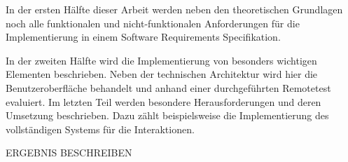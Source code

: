 	In der ersten Hälfte dieser Arbeit werden neben den theoretischen Grundlagen noch alle funktionalen und nicht-funktionalen Anforderungen für die Implementierung in einem Software Requirements Specifikation.
	
	In der zweiten Hälfte wird die Implementierung von besonders wichtigen Elementen beschrieben. Neben der technischen Architektur wird hier die Benutzeroberfläche behandelt und anhand einer durchgeführten Remotetest evaluiert. Im letzten Teil werden besondere Herausforderungen und deren Umsetzung beschrieben. Dazu zählt beispielsweise die Implementierung des vollständigen Systems für die Interaktionen.
	
	ERGEBNIS BESCHREIBEN